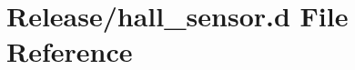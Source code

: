 \hypertarget{hall__sensor_8d}{}\section{Release/hall\+\_\+sensor.d File Reference}
\label{hall__sensor_8d}

